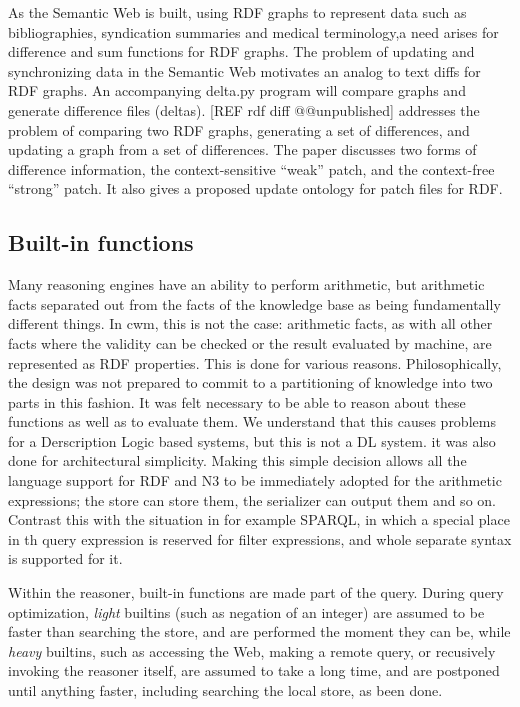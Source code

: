 \documentclass{tlp}
\begin{document}
\par As the Semantic Web is built, using RDF graphs\cite{RDFC04} to represent data such as
bibliographies\cite{DC02}, syndication
summaries\cite{RSS} and medical terminology\cite{Gol03},a need arises for difference and sum functions
for RDF graphs. The problem of updating and synchronizing data in
the Semantic Web motivates an analog to text diffs for RDF graphs.
An accompanying delta.py program will compare graphs and generate
difference files (deltas). [REF rdf diff @@unpublished] addresses
the problem of comparing two RDF graphs, generating a set of
differences, and updating a graph from a set of differences. The
paper discusses two forms of difference information, the
context-sensitive ``weak'' patch, and the context-free
``strong'' patch. It also gives a proposed update ontology for patch files for
RDF.
\subsection{\empty Built-in functions}
  

\par Many reasoning engines have an ability to perform arithmetic,
but arithmetic facts separated out from the facts of the knowledge
base as being fundamentally different things. In cwm, this is not
the case: arithmetic facts, as with all other facts where the
validity can be checked or the result evaluated by machine, are
represented as RDF properties. This is done for various reasons.
Philosophically, the design was not prepared to commit to a
partitioning of knowledge into two parts in this fashion. It was
felt necessary to be able to reason about these functions as well
as to evaluate them. We understand that this causes problems for a
Derscription Logic based systems, but this is not a DL system. it
was also done for architectural simplicity. Making this simple
decision allows all the language support for RDF and N3 to be
immediately adopted for the arithmetic expressions; the store can
store them, the serializer can output them and so on. Contrast this
with the situation in for example SPARQL\cite{SPARQL}, in which a special place in th query
expression is reserved for filter expressions, and whole separate
syntax is supported for it.

\par Within the reasoner, built-in functions are made part of the
query. During query optimization, {\em light} builtins (such as
negation of an integer) are assumed to be faster than searching the
store, and are performed the moment they can be, while
{\em heavy} builtins, such as accessing the Web, making a remote
query, or recusively invoking the reasoner itself, are assumed to
take a long time, and are postponed until anything faster,
including searching the local store, as been done.
\end{document}
